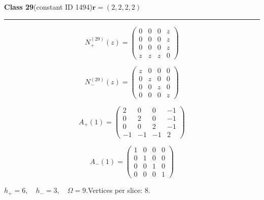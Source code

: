 \noindent\begin{minipage}{\linewidth}
\noindent\textbf{Class 29}\quad\small (constant ID 1494)\hfill $\symbf{r}=(2,2,2,2)$
\par\smallskip\noindent\textcolor{rulegray}{\rule{\linewidth}{0.3pt}}
\begin{minipage}[c]{0.495\linewidth}\centering\fontsize{9.7}{12}\selectfont
\setlength{\abovedisplayskip}{4pt}\setlength{\belowdisplayskip}{4pt}
\setlength{\abovedisplayshortskip}{4pt}\setlength{\belowdisplayshortskip}{4pt}
\setlength{\arraycolsep}{3pt}\renewcommand{\arraystretch}{1.08}
\[N_{+}^{(29)}(z)=\begin{pmatrix}0 & 0 & 0 & z\\0 & 0 & 0 & z\\0 & 0 & 0 & z\\z & z & z & 0\end{pmatrix}\]
\end{minipage}%
\begin{minipage}[c]{0.495\linewidth}\centering\fontsize{9.7}{12}\selectfont
\setlength{\abovedisplayskip}{4pt}\setlength{\belowdisplayskip}{4pt}
\setlength{\abovedisplayshortskip}{4pt}\setlength{\belowdisplayshortskip}{4pt}
\setlength{\arraycolsep}{3pt}\renewcommand{\arraystretch}{1.08}
\[N_{-}^{(29)}(z)=\begin{pmatrix}z & 0 & 0 & 0\\0 & z & 0 & 0\\0 & 0 & z & 0\\0 & 0 & 0 & z\end{pmatrix}\]
\end{minipage}%
\par\noindent
\begin{minipage}[c]{0.495\linewidth}\centering\fontsize{9.7}{12}\selectfont
\setlength{\abovedisplayskip}{4pt}\setlength{\belowdisplayskip}{4pt}
\setlength{\abovedisplayshortskip}{4pt}\setlength{\belowdisplayshortskip}{4pt}
\setlength{\arraycolsep}{3pt}\renewcommand{\arraystretch}{1.08}
\[A_{+}(1)=\begin{pmatrix}2 & 0 & 0 & -1\\0 & 2 & 0 & -1\\0 & 0 & 2 & -1\\-1 & -1 & -1 & 2\end{pmatrix}\]
\end{minipage}%
\begin{minipage}[c]{0.495\linewidth}\centering\fontsize{9.7}{12}\selectfont
\setlength{\abovedisplayskip}{4pt}\setlength{\belowdisplayskip}{4pt}
\setlength{\abovedisplayshortskip}{4pt}\setlength{\belowdisplayshortskip}{4pt}
\setlength{\arraycolsep}{3pt}\renewcommand{\arraystretch}{1.08}
\[A_{-}(1)=\begin{pmatrix}1 & 0 & 0 & 0\\0 & 1 & 0 & 0\\0 & 0 & 1 & 0\\0 & 0 & 0 & 1\end{pmatrix}\]
\end{minipage}%
\par\smallskip\noindent\small $h_+=6,\quad h_-=3,\quad \Omega=9.$\quad Vertices per slice: 8.
\end{minipage}\par\vfill
\clearpage
